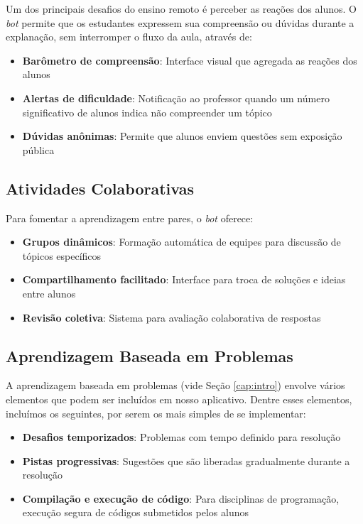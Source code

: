 Um dos principais desafios do ensino remoto é perceber as reações dos alunos. O
\textit{bot} permite que os estudantes expressem sua compreensão ou dúvidas
durante a explanação, sem interromper o fluxo da aula, através de:

\begin{itemize}
\item \textbf{Barômetro de compreensão}: Interface visual que agregada as
reações dos alunos
\item \textbf{Alertas de dificuldade}: Notificação ao professor quando um número
significativo de alunos indica não compreender um tópico
\item \textbf{Dúvidas anônimas}: Permite que alunos enviem questões sem
exposição pública
\end{itemize}

\subsection{Atividades Colaborativas}
\label{subsec:colaboracao}

Para fomentar a aprendizagem entre pares, o \textit{bot} oferece:

\begin{itemize}
\item \textbf{Grupos dinâmicos}: Formação automática de equipes para discussão
de tópicos específicos
\item \textbf{Compartilhamento facilitado}: Interface para troca de soluções e
ideias entre alunos
\item \textbf{Revisão coletiva}: Sistema para avaliação colaborativa de
respostas
\end{itemize}

\subsection{Aprendizagem Baseada em Problemas}
\label{subsec:pbl}

A aprendizagem baseada em problemas (vide Seção \ref{cap:intro}) envolve vários
elementos que podem ser incluídos em nosso aplicativo. Dentre esses elementos,
incluímos os seguintes, por serem os mais simples de se implementar:

\begin{itemize}
\item \textbf{Desafios temporizados}: Problemas com tempo definido para
resolução
\item \textbf{Pistas progressivas}: Sugestões que são liberadas gradualmente
durante a resolução
\item \textbf{Compilação e execução de código}: Para disciplinas de programação,
execução segura de códigos submetidos pelos alunos
\end{itemize}

